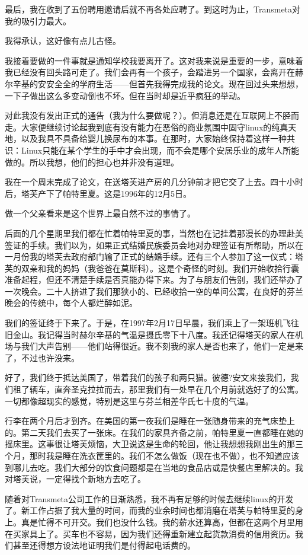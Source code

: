 最后，我在收到了五份聘用邀请后就不再各处应聘了。到这时为止，Transmeta对我的吸引力最大。

我得承认，这好像有点儿古怪。

我接着要做的一件事就是通知学校我要离开了。这对我来说是重要的一步，意味着我已经没有回头路可走了。我们会再有一个孩子，会踏进另一个国家，会离开在赫尔辛基的安安全全的学府生活——但首先我得完成我的论文。现在回过头来想想，一下子做出这么多变动倒也不坏。但在当时却是近乎疯狂的举动。

对此我没有发出正式的通告（我为什么要做呢？）。但消息还是在互联网上不胫而走。大家便继续讨论起我到底有没有能力在恶俗的商业氛围中固守linux的纯真天地，以及我具不具备给婴儿换尿布的本事。在那时，大家始终保持着这样一种共识：Linux只能在某个学生的手中才会出现，而不会是哪个安居乐业的成年人所能做的。所以我想，他们的担心也并非没有道理。

我在一个周末完成了论文，在送塔芙进产房的几分钟前才把它交了上去。四十小时后，塔芙产下了帕特里夏。这是1996年的12月5日。

做一个父亲看来是这个世界上最自然不过的事情了。

后面的几个星期里我们都在忙着帕特里夏的事，当然也在记挂着那漫长的办理赴美签证的手续。我们以为，如果正式结婚民族委员会地对办理签证有所帮助，所以在一月份我的塔芙去政府部门输了正式的结婚手续。还有三个人参加了这一仪式：塔芙的双亲和我的妈妈（我爸爸在莫斯科）。这是个奇怪的时刻。我们开始收拾行囊准备起程，但还不清楚手续是否真能办得下来。为了与朋友们告别，我们还举办了一次晚会。二十人挤进了我们那狭小的、已经收拾一空的单间公寓，在良好的芬兰晚会的传统中，每个人都烂醉如泥。

我们的签证终于下来了。于是，在1997年2月17日早晨，我们乘上了一架班机飞往旧金山。我记得当时赫尔辛基的气温是摄氏零下十八度。我还记得塔芙的家人在机场与我们大声告别——他们站得很近。我不刻我的家人是否也来了，他们一定是来了，不过也许没来。

好了，我们终于抵达美国了，带着我们的孩子和两只猫。彼德?安文来接我们，我们租了辆车，直奔圣克拉拉而去，那里我们有一处早在几个月前就选好了的公寓。一切都像超现实的感觉，特别是这里与芬兰相差华氏七十度的气温。

行李在两个月后才到齐。在美国的第一夜我们是睡在一张随身带来的充气床垫上的。第二天我们去买了一张床。在我们的家具齐备之前，帕特里夏一直都睡在她的摇床里。这事很让塔芙烦恼，大卫说这是生命的轮回，他让我想想我刚出生的那三个月，那时我是睡在洗衣筐里的。我们不怎么做饭（现在也不做），也不知道应该到哪儿去吃。我们大部分的饮食问题都是在当地的食品店或是快餐店里解决的。我对塔芙说，一定得找个新地方去吃了。

随着对Transmeta公司工作的日渐熟悉，我不再有足够的时候去继续linux的开发了。新工作占据了我大量的时间，而我的业余时间也都消磨在塔芙与帕特里夏的身上。真是忙得不可开交。我们也没什么钱。我的薪水还算高，但都在这两个月里用在买家具上了。买车也不容易，因为我们还得重新建立起货款消费的信用资历。我们甚至还得想方设法地证明我们是付得起电话费的。

